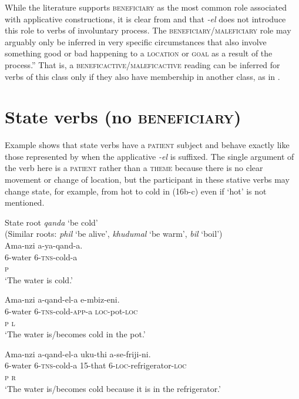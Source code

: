 \documentclass[output=paper]{langsci/langscibook}
\begin{document}
While the literature supports \textsc{beneficiary} as the most common role associated with applicative constructions, it is clear from  and  that \textit{-el} does not introduce this role to verbs of involuntary process. The \textsc{beneficiary}/\textsc{maleficiary} role may arguably only be inferred in very specific circumstances that also involve something good or bad happening to a \textsc{location} or \textsc{goal} as a result of the process.” That is, a \textsc{beneficactive}/\textsc{maleficactive} reading can be inferred for verbs of this class only if they also have membership in another class, as in .

\section{State verbs (no \textsc{beneficiary)}}

Example  shows that state verbs have a \textsc{patient} subject and behave exactly like those represented by  when the applicative \textit{-el} is suffixed. The single argument of the verb here is a \textsc{patient} rather than a \textsc{theme} because there is no clear movement or change of location, but the participant in these stative verbs may change state, for example, from hot to cold in (16b-c) even if ‘hot’ is not mentioned. 

\ea
{State root \textit{qanda} ‘be cold’}\\
 (Similar roots: \textit{phil} ‘be alive’, \textit{khudumal} ‘be warm’, \textit{bil} ‘boil’)\\
\ea
\gll Ama-nzi a-ya-qand-a. \\
 6-water 6-\textsc{tns}-cold-a\\
 \textsc{p }\\
\glt ‘The water is cold.’

\ex
\gll Ama-nzi a-qand-el-a e-mbiz-eni. \\
 6-water 6-\textsc{tns}-cold-\textsc{app}-a \textsc{loc}-pot-\textsc{loc}\\
 \textsc{p l}\\
\glt ‘The water is/becomes cold in the pot.’

\ex
\gll Ama-nzi a-qand-el-a uku-thi a-se-friji-ni. \\
 6-water 6-\textsc{tns}-cold-a \textsc{15}-that 6-\textsc{loc}-refrigerator-\textsc{loc} \\
 \textsc{p r }\\
\glt ‘The water is/becomes cold because it is in the refrigerator.’
\z
\z
\end{document}
